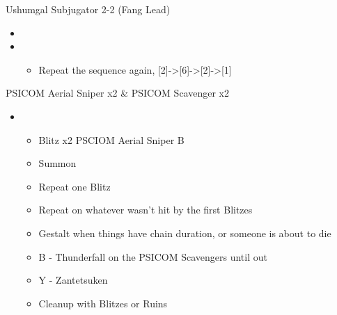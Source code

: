 \documentclass{report}
\begin{document}
\begin{battle}{Ushumgal Subjugator 2-2 (Fang Lead)}
\begin{itemize}
    \begin{itemize}
        \item Auto-defend
        \item Potion
        \item Potion if Fang's HP isn't green, otherwise Provoke x3
    \end{itemize}
    \item \stagger
    \item \second
    \begin{itemize}
        \item Repeat the sequence again, [2]->[6]->[2]->[1]
    \end{itemize}
\end{itemize}
\end{battle}
\renewcommand{\second}{[2] Relentless Assault (\rav/\com/\rav)}
\begin{battle}{PSICOM Aerial Sniper x2 \& PSICOM Scavenger x2}
\begin{itemize}
    \item \first
    \begin{itemize}
        \item Blitz x2 PSCIOM Aerial Sniper B
        \item Summon
        \item Repeat one Blitz
        \item Repeat on whatever wasn't hit by the first Blitzes
        \item Gestalt when things have chain duration, or someone is about to die
        \item B - Thunderfall on the PSICOM Scavengers until out
        \item Y - Zantetsuken
        \item Cleanup with Blitzes or Ruins
    \end{itemize}
\end{itemize}
 
\end{battle}
\end{document}
